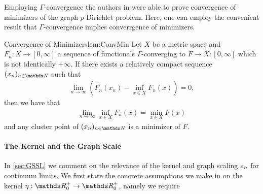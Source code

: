%
%
Employing $\Gamma$-convergence the authors in \cite{slepcev2019analysis} were able to prove convergence of minimizers of the graph $p$-Dirichlet problem. Here, one can employ the convenient result that $\Gamma$-convergence implies converrgence of minimizers.
%
\begin{lemma}{\cite[Thm. 1.21]{Brad02} Convergence of Minimizers}{lem:ConvMin}
	Let $X$ be a metric space and $F_n:X\rightarrow [0,\infty]$ a sequence of 
	functionals $\Gamma$-converging to $F\rightarrow X:[0,\infty]$ which is not 
	identically $+\infty$. 
	If there exists a relatively compact sequence $(x_n)_{n\in\N}$ such that 
	\begin{align*}
		\lim_{n\rightarrow\infty} \left(F_n(x_n) - \inf_{x\in X} F_n(x)\right) = 0, 
	\end{align*}
	then we have that 
	\begin{align*}
		\lim_{n\rightarrow\infty} \inf_{x\in X} F_n(x) = \min_{x\in X} F(x)
	\end{align*}
	and any cluster point of $(x_n)_{n\in\N}$ is a minimizer of $F$.
\end{lemma}
%
%
\paragraph{The Kernel and the Graph Scale}
%
In \cref{sec:GSSL} we comment on the relevance of the kernel and graph scaling $\varepsilon_n$ for continuum limits. We first state the concrete assumptions we make in \cite{roith2022continuum} on the kernel $\eta:\R_0^+\to\R_0^+$, namely we require

